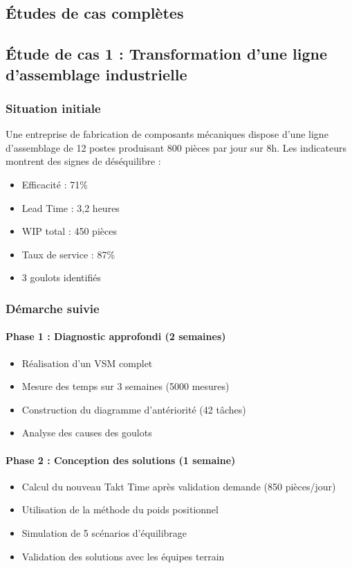 \documentclass[12pt,a4paper]{article}
\begin{document}
\begin{center}
\section{Études de cas complètes}

\subsection{Étude de cas 1 : Transformation d'une ligne d'assemblage industrielle}

\subsubsection{Situation initiale}
Une entreprise de fabrication de composants mécaniques dispose d'une ligne d'assemblage de 12 postes produisant 800 pièces par jour sur 8h. Les indicateurs montrent des signes de déséquilibre :

\begin{itemize}
    \item Efficacité : 71\%
    \item Lead Time : 3,2 heures
    \item WIP total : 450 pièces
    \item Taux de service : 87\%
    \item 3 goulots identifiés
\end{itemize}

\subsubsection{Démarche suivie}

\paragraph{Phase 1 : Diagnostic approfondi (2 semaines)}
\begin{itemize}
    \item Réalisation d'un VSM complet
    \item Mesure des temps sur 3 semaines (5000 mesures)
    \item Construction du diagramme d'antériorité (42 tâches)
    \item Analyse des causes des goulots
\end{itemize}

\paragraph{Phase 2 : Conception des solutions (1 semaine)}
\begin{itemize}
    \item Calcul du nouveau Takt Time après validation demande (850 pièces/jour)
    \item Utilisation de la méthode du poids positionnel
    \item Simulation de 5 scénarios d'équilibrage
    \item Validation des solutions avec les équipes terrain
\end{itemize}


\end{center}
\end{document}
